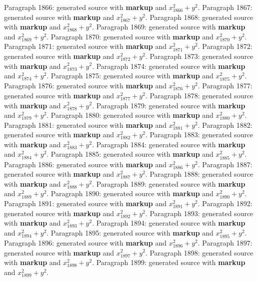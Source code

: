 \documentclass{article}
\begin{document}
Paragraph 1866: generated source with \textbf{markup} and $x_{1866}^2 + y^2$.
Paragraph 1867: generated source with \textbf{markup} and $x_{1867}^2 + y^2$.
Paragraph 1868: generated source with \textbf{markup} and $x_{1868}^2 + y^2$.
Paragraph 1869: generated source with \textbf{markup} and $x_{1869}^2 + y^2$.
Paragraph 1870: generated source with \textbf{markup} and $x_{1870}^2 + y^2$.
Paragraph 1871: generated source with \textbf{markup} and $x_{1871}^2 + y^2$.
Paragraph 1872: generated source with \textbf{markup} and $x_{1872}^2 + y^2$.
Paragraph 1873: generated source with \textbf{markup} and $x_{1873}^2 + y^2$.
Paragraph 1874: generated source with \textbf{markup} and $x_{1874}^2 + y^2$.
Paragraph 1875: generated source with \textbf{markup} and $x_{1875}^2 + y^2$.
Paragraph 1876: generated source with \textbf{markup} and $x_{1876}^2 + y^2$.
Paragraph 1877: generated source with \textbf{markup} and $x_{1877}^2 + y^2$.
Paragraph 1878: generated source with \textbf{markup} and $x_{1878}^2 + y^2$.
Paragraph 1879: generated source with \textbf{markup} and $x_{1879}^2 + y^2$.
Paragraph 1880: generated source with \textbf{markup} and $x_{1880}^2 + y^2$.
Paragraph 1881: generated source with \textbf{markup} and $x_{1881}^2 + y^2$.
Paragraph 1882: generated source with \textbf{markup} and $x_{1882}^2 + y^2$.
Paragraph 1883: generated source with \textbf{markup} and $x_{1883}^2 + y^2$.
Paragraph 1884: generated source with \textbf{markup} and $x_{1884}^2 + y^2$.
Paragraph 1885: generated source with \textbf{markup} and $x_{1885}^2 + y^2$.
Paragraph 1886: generated source with \textbf{markup} and $x_{1886}^2 + y^2$.
Paragraph 1887: generated source with \textbf{markup} and $x_{1887}^2 + y^2$.
Paragraph 1888: generated source with \textbf{markup} and $x_{1888}^2 + y^2$.
Paragraph 1889: generated source with \textbf{markup} and $x_{1889}^2 + y^2$.
Paragraph 1890: generated source with \textbf{markup} and $x_{1890}^2 + y^2$.
Paragraph 1891: generated source with \textbf{markup} and $x_{1891}^2 + y^2$.
Paragraph 1892: generated source with \textbf{markup} and $x_{1892}^2 + y^2$.
Paragraph 1893: generated source with \textbf{markup} and $x_{1893}^2 + y^2$.
Paragraph 1894: generated source with \textbf{markup} and $x_{1894}^2 + y^2$.
Paragraph 1895: generated source with \textbf{markup} and $x_{1895}^2 + y^2$.
Paragraph 1896: generated source with \textbf{markup} and $x_{1896}^2 + y^2$.
Paragraph 1897: generated source with \textbf{markup} and $x_{1897}^2 + y^2$.
Paragraph 1898: generated source with \textbf{markup} and $x_{1898}^2 + y^2$.
Paragraph 1899: generated source with \textbf{markup} and $x_{1899}^2 + y^2$.
\end{document}
